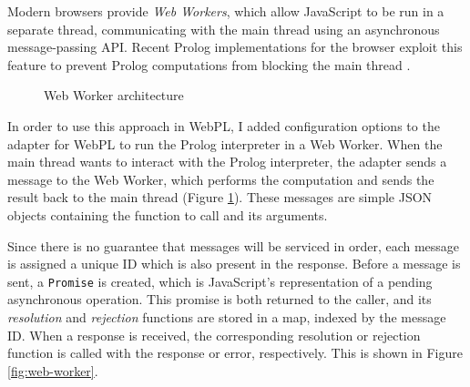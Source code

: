 Modern browsers provide \emph{Web Workers}, which allow JavaScript to be run in a separate thread, communicating with the main thread using an asynchronous message-passing API. Recent Prolog implementations for the browser exploit this feature to prevent Prolog computations from blocking the main thread \cite{garcia-pradalessCASPInBrowserPlayground2022, riazaTauPrologProlog2024}.

\begin{figure}[H]
\centering
{}
\caption{Web Worker architecture}
\label{fig:web-worker-arch}
\end{figure}

In order to use this approach in WebPL, I added configuration options to the adapter for WebPL to run the Prolog interpreter in a Web Worker. When the main thread wants to interact with the Prolog interpreter, the adapter sends a message to the Web Worker, which performs the computation and sends the result back to the main thread (Figure \ref{fig:web-worker-arch}). These messages are simple JSON objects containing the function to call and its arguments.

Since there is no guarantee that messages will be serviced in order, each message is assigned a unique ID which is also present in the response. Before a message is sent, a \texttt{Promise} is created, which is JavaScript's representation of a pending asynchronous operation. This promise is both returned to the caller, and its \emph{resolution} and \emph{rejection} functions are stored in a map, indexed by the message ID. When a response is received, the corresponding resolution or rejection function is called with the response or error, respectively. This is shown in Figure \ref{fig:web-worker}.

